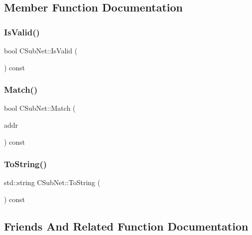 \subsection{Member Function Documentation}
\mbox{\label{class_c_sub_net_abe05f70043af710ac075a4dd77757394}} 
\subsubsection{\texorpdfstring{Is\+Valid()}{IsValid()}}
{\footnotesize\ttfamily bool C\+Sub\+Net\+::\+Is\+Valid (\begin{DoxyParamCaption}{ }\end{DoxyParamCaption}) const}

\mbox{\label{class_c_sub_net_af84fa02ebca222739c55e9d2cd7d38a3}} 
\subsubsection{\texorpdfstring{Match()}{Match()}}
{\footnotesize\ttfamily bool C\+Sub\+Net\+::\+Match (\begin{DoxyParamCaption}\item[{const \mbox{\hyperlink{class_c_net_addr}{C\+Net\+Addr}} \&}]{addr }\end{DoxyParamCaption}) const}

\mbox{\label{class_c_sub_net_a91cabfec6c5056fe8f8b477334563880}} 
\subsubsection{\texorpdfstring{To\+String()}{ToString()}}
{\footnotesize\ttfamily std\+::string C\+Sub\+Net\+::\+To\+String (\begin{DoxyParamCaption}{ }\end{DoxyParamCaption}) const}



\subsection{Friends And Related Function Documentation}
\mbox{\label{class_c_sub_net_a009219cad6ef9a6d6da9b9a876e43b9d}} 
